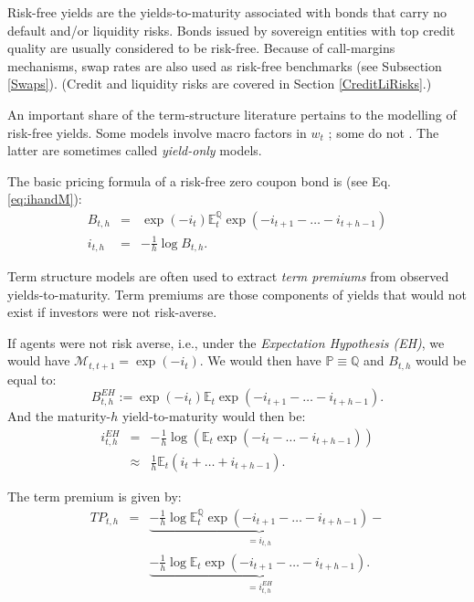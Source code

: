 \documentclass[
  12pt,
]{book}
\theoremstyle{definition}
\theoremstyle{definition}
\theoremstyle{definition}
\theoremstyle{definition}
\theoremstyle{remark}
\begin{document}
Risk-free yields are the yields-to-maturity associated with bonds that carry no default and/or liquidity risks. Bonds issued by sovereign entities with top credit quality are usually considered to be risk-free. Because of call-margins mechanisms, swap rates are also used as risk-free benchmarks \citep{Duffie_Stein_2015} (see Subsection \ref{Swaps}). (Credit and liquidity risks are covered in Section \ref{CreditLiRisks}.)

An important share of the term-structure literature pertains to the modelling of risk-free yields. Some models involve macro factors in \(w_t\) \citep{Ang_Piazzesi_2003}; some do not \citep{Duffie_Singleton_1997}. The latter are sometimes called \emph{yield-only} models.

The basic pricing formula of a risk-free zero coupon bond is (see Eq. \eqref{eq:ihandM}):
\begin{eqnarray}
B_{t,h} &=& \exp(-i_{t}) \mathbb{E}^{\mathbb{Q}}_t \exp(-i_{t+1}-\dots-i_{t+h-1})\\
i_{t,h} &=& - \frac{1}{h} \log B_{t,h}. \label{eq:stdbondRFchapter}
\end{eqnarray}

Term structure models are often used to extract \emph{term premiums} from observed yields-to-maturity. Term premiums are those components of yields that would not exist if investors were not risk-averse.

If agents were not risk averse, i.e., under the \emph{Expectation Hypothesis (EH)}, we would have \(\mathcal{M}_{t,t+1} = \exp(- i_t)\). We would then have \(\mathbb{P} \equiv \mathbb{Q}\) and \(B_{t,h}\) would be equal to:
\begin{equation}
B^{EH}_{t,h} := \exp(-i_{t}) \mathbb{E}_t \exp(-i_{t+1}-\dots-i_{t+h-1}).\label{eq:stdbondRFchapterP}
\end{equation}
And the maturity-\(h\) yield-to-maturity would then be:
\begin{eqnarray}
i^{EH}_{t,h} &=& -\frac{1}{h}\log \left( \mathbb{E}_t \exp(-i_t-\dots-i_{t+h-1})\right)\nonumber\\
&\approx& \frac{1}{h}\mathbb{E}_t(i_t + \dots + i_{t+h-1}).\label{eq:REH}
\end{eqnarray}

The term premium is given by:
\begin{eqnarray}
TP_{t,h} &=& \underbrace{- \frac{1}{h} \log  \mathbb{E}^{\mathbb{Q}}_t \exp(-i_{t+1}-\dots-i_{t+h-1})}_{=i_{t,h}} - \nonumber \\
&& \underbrace{- \frac{1}{h}  \log  \mathbb{E}_t \exp(-i_{t+1}-\dots-i_{t+h-1}).}_{=i^{EH}_{t,h}}\label{eq:TP}
\end{eqnarray}
\end{document}
